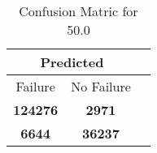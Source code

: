 \begin{table}[] 
\caption{Confusion Matric for 50.0} 
\label{Table: Prediction Accuracy-DMD50.0OnlySunEKF-resetReflectionEKF-top2perfectNoFailurePrediction-Reflection} 
\centering 
\begin{tabular} 
 {@{}ccc@{}} 
\toprule 
\multicolumn{2}{c}{\textbf{Predicted}}
 \\ \midrule 
\multicolumn{1}{|c|}{Failure} & 
\multicolumn{1}{c|}{No Failure}
 \\ \midrule 
\multicolumn{1}{|c|}{\color{green}\textbf{124276}} & 
\multicolumn{1}{c|}{\color{red}\textbf{2971}}
 \\ \midrule 
\multicolumn{1}{|c|}{\color{red}\textbf{6644}} & 
\multicolumn{1}{c|}{\color{green}\textbf{36237}}
 \\ \bottomrule 
\end{tabular} 
\end{table} 
